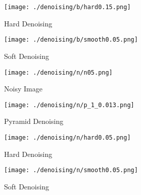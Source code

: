 \documentclass{article}
\begin{document}
    \begin{figure}[!htb]
      \texttt{[image: ./denoising/b/hard0.15.png]}
      \caption{Hard Denoising}
    \endminipage \hfill
      \texttt{[image: ./denoising/b/smooth0.05.png]}
      \caption{Soft Denoising}
    \endminipage
    \end{figure}
    \pagebreak

    \pagebreak

    \begin{figure}[!htb]
      \texttt{[image: ./denoising/n/n05.png]}
      \caption{Noisy Image}
    \endminipage \hfill
      \texttt{[image: ./denoising/n/p\_1\_0.013.png]}
      \caption{Pyramid Denoising}
    \endminipage
    \end{figure}
    

    \begin{figure}[!htb]
      \texttt{[image: ./denoising/n/hard0.05.png]}
      \caption{Hard Denoising}
    \endminipage \hfill
      \texttt{[image: ./denoising/n/smooth0.05.png]}
      \caption{Soft Denoising}
    \endminipage
    \end{figure}
    \pagebreak

\end{document}
